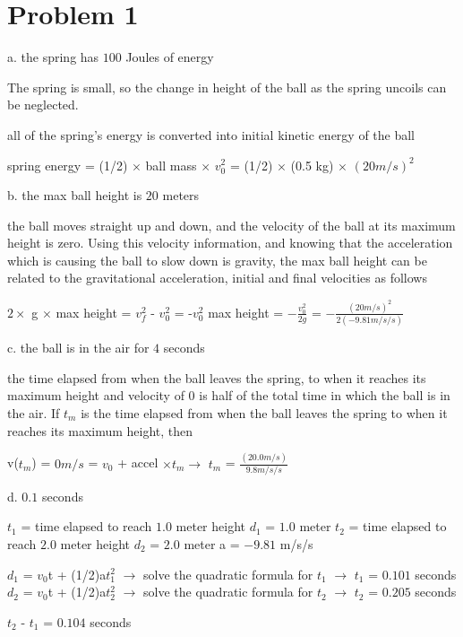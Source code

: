 \chapter{Problem 1}
\label{Problem 1}
a. the spring has $100$ Joules of energy

The spring is small, so the change in height of the ball as the spring uncoils can be neglected.

all of the spring's energy is converted into initial kinetic energy of the ball

spring energy = (1/2) $\times$ ball mass $\times$ $v_{0}^{2}$
			  = (1/2) $\times$ (0.5 kg) $\times$ $(20 m/s)^{2}$


b. the max ball height is $20$ meters

the ball moves straight up and down, and the velocity of the ball at its maximum height is zero.
Using this velocity information, and knowing that the acceleration which is causing the ball
to slow down is gravity, the max ball height can be related to the gravitational acceleration,
initial and final velocities as follows

$2 \times$ g $\times$ max height = $v_{f}^{2}$ - $v_{0}^{2}$ = -$v_{0}^{2}$
max height = $ -\frac{v_{0}^{2}}{2g} $ = $-\frac{(20 m/s)^{2}}{2(-9.81 m/s/s)}$


c. the ball is in the air for $4$ seconds

the time elapsed from when the ball leaves the spring, to when it reaches its maximum height
and velocity of $0$ is half of the total time in which the ball is in the air.
If $t_{m}$ is the time elapsed from when the ball leaves the spring to when it reaches its
maximum height, then

v($t_{m}$) = $0 m/s$ = $v_{0}$ + accel $\times t_{m} \rightarrow$ $t_{m}$ = $\frac{(20.0 m/s)}{9.8 m/s/s}$


d. $0.1$ seconds

$t_{1}$ = time elapsed to reach $1.0$ meter height   $d_{1}$ = $1.0$ meter
$t_{2}$ = time elapsed to reach $2.0$ meter height   $d_{2}$ = $2.0$ meter
a = $-9.81$ m/s/s

$d_{1}$ = $v_{0}$t + (1/2)a$t_{1}^{2}$ $\rightarrow$ solve the quadratic formula for $t_{1}$ $\rightarrow$ $t_{1}$ = $0.101$ seconds
$d_{2}$ = $v_{0}$t + (1/2)a$t_{2}^{2}$ $\rightarrow$ solve the quadratic formula for $t_{2}$ $\rightarrow$ $t_{2}$ = $0.205$ seconds

$t_{2}$ - $t_{1}$ = $0.104$ seconds

